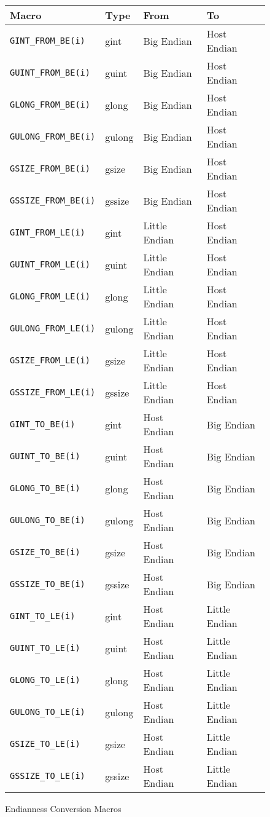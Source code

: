\begin{figure}[h!]
\centering
\begin{tabular}{l | l | l | l}
Macro & Type & From & To \\
\hline
\verb|GINT_FROM_BE(i)| & gint & Big Endian & Host Endian \\
\verb|GUINT_FROM_BE(i)| & guint & Big Endian & Host Endian \\
\verb|GLONG_FROM_BE(i)| & glong & Big Endian & Host Endian \\
\verb|GULONG_FROM_BE(i)| & gulong & Big Endian & Host Endian \\
\verb|GSIZE_FROM_BE(i)| & gsize & Big Endian & Host Endian \\
\verb|GSSIZE_FROM_BE(i)| & gssize & Big Endian & Host Endian \\
\verb|GINT_FROM_LE(i)| & gint & Little Endian & Host Endian \\
\verb|GUINT_FROM_LE(i)| & guint & Little Endian & Host Endian \\
\verb|GLONG_FROM_LE(i)| & glong & Little Endian & Host Endian \\
\verb|GULONG_FROM_LE(i)| & gulong & Little Endian & Host Endian \\
\verb|GSIZE_FROM_LE(i)| & gsize & Little Endian & Host Endian \\
\verb|GSSIZE_FROM_LE(i)| & gssize & Little Endian & Host Endian \\
\verb|GINT_TO_BE(i)| & gint & Host Endian & Big Endian \\
\verb|GUINT_TO_BE(i)| & guint & Host Endian & Big Endian \\
\verb|GLONG_TO_BE(i)| & glong & Host Endian & Big Endian \\
\verb|GULONG_TO_BE(i)| & gulong & Host Endian & Big Endian \\
\verb|GSIZE_TO_BE(i)| & gsize & Host Endian & Big Endian \\
\verb|GSSIZE_TO_BE(i)| & gssize & Host Endian & Big Endian \\
\verb|GINT_TO_LE(i)| & gint & Host Endian & Little Endian \\
\verb|GUINT_TO_LE(i)| & guint & Host Endian & Little Endian \\
\verb|GLONG_TO_LE(i)| & glong & Host Endian & Little Endian \\
\verb|GULONG_TO_LE(i)| & gulong & Host Endian & Little Endian \\
\verb|GSIZE_TO_LE(i)| & gsize & Host Endian & Little Endian \\
\verb|GSSIZE_TO_LE(i)| & gssize & Host Endian & Little Endian \\
\end{tabular}
\caption{Endianness Conversion Macros}
\label{fig:endianness}
\end{figure}

